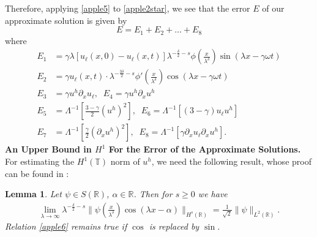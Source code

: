 \documentclass[12pt,reqno]{amsart}
\newcommand{\rr}{\mathbb{R}}
\newcommand{\p}{\partial}
\newcommand{\ci}{\mathbb{T}}
\theoremstyle{plain}  %
\newtheorem{lemma}{Lemma}
\theoremstyle{definition}
\begin{document}
				 Therefore, applying \eqref{apple5} to \eqref{apple2star}, we see that the error
				 $E$ of our approximate solution is given by
				 \begin{equation*}
					 E=E_1 + E_2 + \dots + E_8
				 \end{equation*}
				 where
				 \begin{equation}
					 \label{all_errors_together}
					 \begin{split}
						  E_1 & = \gamma \lambda \left[ u_\ell(x,0) - u_\ell(x,t)
						 \right] \lambda^{-\frac{\delta}{2}-s} \phi\left(
						 \frac{x}{\lambda^ \delta}
						 \right)\sin(\lambda x - \gamma \omega t)
						 \\
						 E_2 & = \gamma u_\ell(x,t) \cdot \lambda^{-\frac{3\delta}{2}-s}
						 \phi'\left( \frac{x}{\lambda^\delta} \right)\cos\left( \lambda
						 x - \gamma \omega t
						 \right)
						 \\
						 E_3 & = \gamma u^h \p_x u_\ell, \; \; E_4 = \gamma u^h \p_x u^h
						 \\
						 E_5 & = \Lambda^{-1}\left[ \frac{3-\gamma}{2} \left(
						 u^h \right)^2 
						 \right], \; \; E_6 = \Lambda^{-1}
						 \left[ (3- \gamma)u_\ell u^h \right]
						 \\
						 E_7 & = \Lambda^{-1} \left[ \frac{\gamma}{2} \left(
						 \p_x u^h \right)^2 \right ], \; \;
						 E_8 = \Lambda^{-1} \left[ \gamma \p_x u_\ell \p_x u^h \right]
						 .
						 \end{split}
				 \end{equation}
				 \vskip0.1in
				 {\bf An Upper Bound in $H^1$ For the Error of the Approximate
				 Solutions.}
				 \vskip0.1in
				 For estimating the $H^1(\ci)$ norm of $u^h$, we need the
				 following result, whose proof can be found in \cite{hk}:
				  \begin{lemma}
					 \label{applea}
					 Let $\psi \in S(\rr)$, $\alpha \in \rr$. Then for $s \ge 0$ we have
					 \begin{equation}
						 \begin{split}
							 \lim_{\lambda \to \infty} \lambda^{-\frac{\delta}{2}-s}
							 \|\psi \left( \frac{x}{\lambda^\delta} \right)\cos(\lambda
							 x - \alpha) \|_{H^s(\rr)} = \frac{1}{\sqrt
							 2}\|\psi\|_{L^2(\rr)}.
							 \label{apple6}
						 \end{split}
					 \end{equation}
					 Relation \eqref{apple6} remains true if $\cos$ is
					 replaced by $\sin$.
				 \end{lemma}
\end{document}
